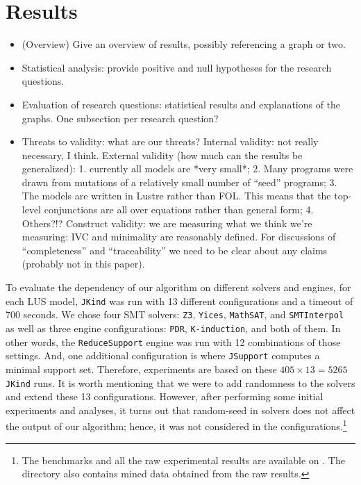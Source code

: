 \section{Results}

\begin{itemize}
    \item (Overview) Give an overview of results, possibly referencing a graph or two.
    \item Statistical analysis: provide positive and null hypotheses for the research questions.
    \item Evaluation of research questions: statistical results and explanations of the graphs.  One subsection per research question?
    \item Threats to validity: what are our threats?
    Internal validity: not really necessary, I think.
    External validity (how much can the results be generalized):
        1. currently all models are *very small*;
        2. Many programs were drawn from mutations of a relatively small number of ``seed'' programs;
        3. The models are written in Lustre rather than FOL.  This means that the
            top-level conjunctions are all over equations rather than general
            form;
        4. Others?!?
    Construct validity: we are measuring what we think we're measuring: IVC and minimality are reasonably defined.  For discussions of ``completeness'' and ``traceability'' we need to be clear about any claims (probably not in this paper).
\end{itemize}



To evaluate the dependency of our algorithm on different solvers and engines, for each LUS model, \texttt{JKind} was run with 13 different configurations and a timeout of 700 seconds. We chose four SMT solvers: \texttt{Z3}, \texttt{Yices}, \texttt{MathSAT}, and \texttt{SMTInterpol} as well as three engine configurations: \texttt{PDR},
\texttt{K-induction}, and both of them. In other words, the \texttt{ReduceSupport} engine was run with 12 combinations of those settings. And, one additional configuration is where \texttt{JSupport} computes a minimal support set. Therefore, experiments are based on these $405 \times 13 = 5265$ \texttt{JKind} runs. It is worth mentioning that we were to add randomness to the solvers and extend these 13 configurations. However, after performing some initial experiments and analyses, it turns out that random-seed in solvers does not affect the output of our algorithm; hence, it was not considered in the configurations.\footnote{The benchmarks and all the raw experimental results are available on \cite{expr}. The directory also contains mined data obtained from the raw results.}

